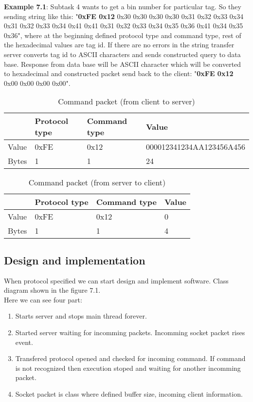 \textbf{Example 7.1}: Subtask 4 wants to get a bin number for particular tag. So they sending string like this: 
"\textbf{0xFE 0x12} 0x30 0x30 0x30 0x30 0x31 0x32 0x33 0x34 0x31 0x32 0x33 0x34 0x41 0x41 0x31 0x32 0x33 0x34 0x35 0x36 0x41 0x34 0x35 0x36", where at the beginning defined protocol type and command type, rest of the hexadecimal values are tag id. If there are no errors in the string transfer server converts tag id to ASCII characters and sends constructed query to data base. Response from data base will be ASCII character which will be converted to hexadecimal and constructed packet send back to the client: "\textbf{0xFE 0x12} 0x00 0x00 0x00 0x00".

\begin{table}[h]
	\centering
    \begin{tabular}{ | p{1cm} | p{3cm} | p{3cm} | p{5cm} |}
    \hline
	& \textbf{Protocol type} & \textbf{Command type} & \textbf{Value}  \\ \hline
	Value & 0xFE & 0x12 & 000012341234AA123456A456 \\ \hline
	Bytes & 1 & 1 & 24  \\ \hline
    \end{tabular}
	\caption{Command packet (from client to server)}
	\label{tab:FromClient}
\end{table}

\begin{table}[h]
	\centering
    \begin{tabular}{ | p{1cm} | p{3cm} | p{3cm} | p{5cm} |}
    \hline
	& \textbf{Protocol type} & \textbf{Command type} & \textbf{Value}  \\ \hline
	Value & 0xFE & 0x12 & 0 \\ \hline
	Bytes & 1 & 1 & 4  \\ \hline
    \end{tabular}
	\caption{Command packet (from server to client)}
	\label{tab:FromServer}
\end{table}

\subsection{Design and implementation}

When protocol specified we can start design and implement software. Class diagram shown in the figure 7.1. \\ Here we can see four part:

\begin{enumerate}
	\item Starts server and stops main thread forever.
	\item Started server waiting for incomming packets. Incomming socket packet rises event.
	\item Transfered protocol opened and checked for incoming command. If command is not recognized then execution stoped and waiting for another incomming packet.
	\item Socket packet is class where defined buffer size, incoming client information.
\end{enumerate}

